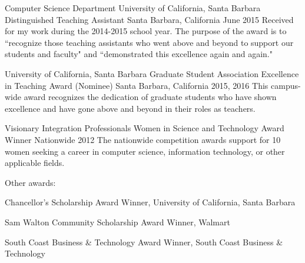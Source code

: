 \begin{cventries}


\cventry
{Computer Science Department \newline University of California, Santa Barbara}
    {Distinguished Teaching Assistant}
    {Santa Barbara, California}
    {June 2015}
    {
      Received for my work during the 2014-2015 school year. The purpose of the award is to ``recognize those teaching assistants who went above and beyond to support our students and faculty"​ and ``demonstrated this excellence again and again."
    }

\cventry
{University of California, Santa Barbara}
    {Graduate Student Association Excellence in Teaching Award (Nominee)}
    {Santa Barbara, California}
    {2015, 2016}
    {
      This campus-wide award recognizes the dedication of graduate students who have shown excellence and have gone above and beyond in their roles as teachers.
    }

\cventry
{Visionary Integration Professionals}
    {Women in Science and Technology Award Winner}
    {Nationwide}
    {2012}
    {
      The nationwide competition awards support for 10 women seeking a career in computer science, information technology, or other applicable fields.
    }

 \cventry
{ }
{Other awards:\vspace{-6mm}}
{ }
{ }
{\begin{cvitems}
\item Chancellor's Scholarship Award Winner, University of California, Santa Barbara
\item Sam Walton Community Scholarship Award Winner, Walmart
\item South Coast Business \& Technology Award Winner, South Coast Business \& Technology
\end{cvitems}
}


%



\end{cventries}
